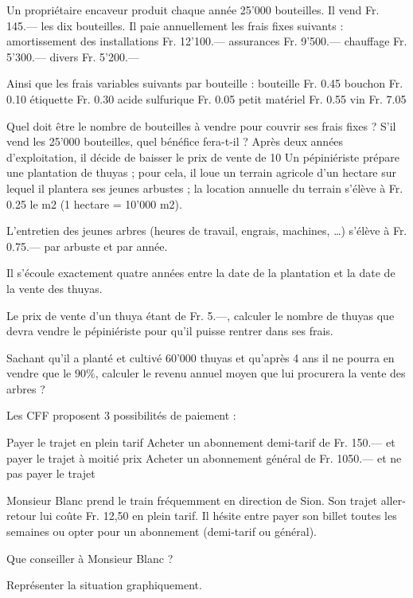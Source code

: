 \begin{exercice}
Un propriétaire encaveur produit chaque année 25'000 bouteilles. Il vend Fr. 145.–– les dix bouteilles.
Il paie annuellement les frais fixes suivants : 
amortissement des installations	Fr. 12'100.—
assurances	Fr.   9'500.—
chauffage	Fr.   5'300.––
divers	Fr.   5'200.––
 
 
Ainsi que les frais variables suivants par bouteille : 
bouteille	Fr. 0.45
bouchon	Fr. 0.10
étiquette	Fr. 0.30
acide sulfurique	Fr. 0.05
petit matériel	Fr. 0.55
vin	Fr. 7.05
 

Quel doit être le nombre de bouteilles à vendre pour couvrir ses frais fixes ?
S'il vend les 25'000 bouteilles, quel bénéfice fera-t-il ?
Après deux années d'exploitation, il décide de baisser le prix de vente de 10 %
Un pépiniériste prépare une plantation de thuyas ; pour cela, il loue un terrain agricole d’un hectare sur lequel il plantera ses jeunes arbustes ; la location annuelle du terrain s’élève à Fr. 0.25 le m2 (1 hectare = 10'000 m2).
\end{exercice}

\begin{exercice}
L’entretien des jeunes arbres (heures de travail, engrais, machines, …) s’élève à Fr. 0.75.–– par arbuste et par année.

Il s’écoule exactement quatre années entre la date de la plantation et la date de la vente des thuyas.

Le prix de vente d’un thuya étant de Fr. 5.––, calculer le nombre de thuyas que devra vendre le pépiniériste pour qu’il puisse rentrer dans ses frais.

Sachant qu’il a planté et cultivé 60'000 thuyas et qu’après 4 ans il ne pourra en vendre que le $90 \%$, calculer le revenu annuel moyen que lui procurera la vente des arbres ?
\end{exercice}

\begin{exercice}
Les CFF proposent 3 possibilités de paiement :

Payer le trajet en plein tarif 
Acheter un abonnement demi-tarif de Fr. 150.— et payer le trajet à moitié prix
Acheter un abonnement général de Fr. 1050.— et ne pas payer le trajet 

Monsieur Blanc prend le train fréquemment en direction de Sion. 
Son trajet aller-retour lui coûte Fr. 12,50 en plein tarif. Il hésite entre payer son billet toutes les semaines ou opter pour un abonnement (demi-tarif ou général). 

Que conseiller à Monsieur Blanc ?

Représenter la situation graphiquement.
\end{exercice}